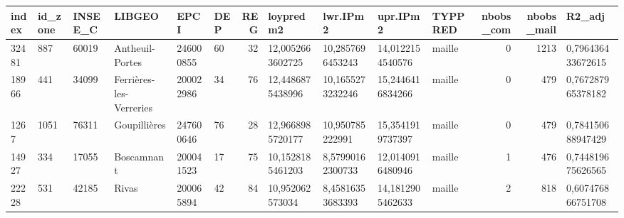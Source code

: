 \begin{tabular}{llllllrllllrrl}
\toprule
\textbf{index}  & \textbf{id\_zone} & \textbf{INSEE\_C} &                   \textbf{LIBGEO} &       \textbf{EPCI} & \textbf{DEP} &  \textbf{REG} &         loypredm2 &          lwr.IPm2 &          upr.IPm2 & TYPPRED &  nbobs\_com &  nbobs\_mail &             R2\_adj \\
\midrule
32481 &     887 &   60019 &          Antheuil-Portes &  246000855 &  60 &   32 &  12,0052663602725 &  10,2857696453243 &  14,0122154540576 &  maille &          0 &        1213 &  0,796436433672615 \\
18966 &     441 &   34099 &  Ferrières-les-Verreries &  200022986 &  34 &   76 &  12,4486875438996 &  10,1655273232246 &  15,2446416834266 &  maille &          0 &         479 &  0,767287965378182 \\
1267  &    1051 &   76311 &             Goupillières &  247600646 &  76 &   28 &  12,9668985720177 &   10,950785222991 &  15,3541919737397 &  maille &          0 &         479 &  0,784150688947429 \\
14927 &     334 &   17055 &               Boscamnant &  200041523 &  17 &   75 &  10,1528185461203 &  8,57990162300733 &  12,0140916480946 &  maille &          1 &         476 &  0,744819675626565 \\
22228 &     531 &   42185 &                    Rivas &  200065894 &  42 &   84 &   10,952062573034 &  8,45816353683393 &  14,1812905462633 &  maille &          2 &         818 &  0,607476866751708 \\
\bottomrule
\end{tabular}
